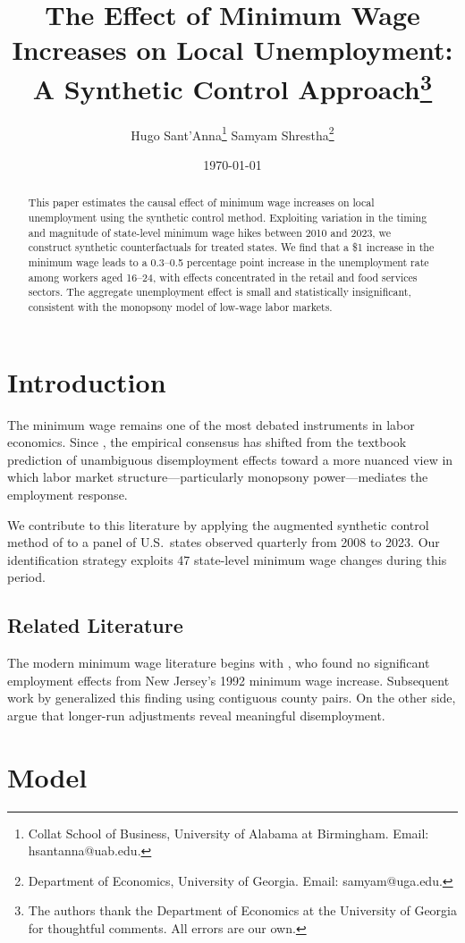 \documentclass{article}
\title{The Effect of Minimum Wage Increases on Local Unemployment: A Synthetic Control Approach\thanks{The authors thank the Department of Economics at the University of Georgia for thoughtful comments. All errors are our own.}}
\author{Hugo Sant'Anna\thanks{Collat School of Business, University of Alabama at Birmingham. Email: hsantanna@uab.edu.} \quad Samyam Shrestha\thanks{Department of Economics, University of Georgia. Email: samyam@uga.edu.}}
\date{\today}
\begin{document}
\maketitle

\begin{abstract}
This paper estimates the causal effect of minimum wage increases on local unemployment using the synthetic control method. Exploiting variation in the timing and magnitude of state-level minimum wage hikes between 2010 and 2023, we construct synthetic counterfactuals for treated states. We find that a \$1 increase in the minimum wage leads to a 0.3--0.5 percentage point increase in the unemployment rate among workers aged 16--24, with effects concentrated in the retail and food services sectors. The aggregate unemployment effect is small and statistically insignificant, consistent with the monopsony model of low-wage labor markets.
\end{abstract}

\section{Introduction}

The minimum wage remains one of the most debated instruments in labor economics. Since \citet{card1994minimum}, the empirical consensus has shifted from the textbook prediction of unambiguous disemployment effects toward a more nuanced view in which labor market structure---particularly monopsony power---mediates the employment response.

We contribute to this literature by applying the augmented synthetic control method of \citet{ben2021augmented} to a panel of U.S.\ states observed quarterly from 2008 to 2023. Our identification strategy exploits 47 state-level minimum wage changes during this period.

\subsection{Related Literature}

The modern minimum wage literature begins with \citet{card1994minimum}, who found no significant employment effects from New Jersey's 1992 minimum wage increase. Subsequent work by \citet{dube2010minimum} generalized this finding using contiguous county pairs. On the other side, \citet{neumark2014revisiting} argue that longer-run adjustments reveal meaningful disemployment.

\section{Model}
\end{document}
